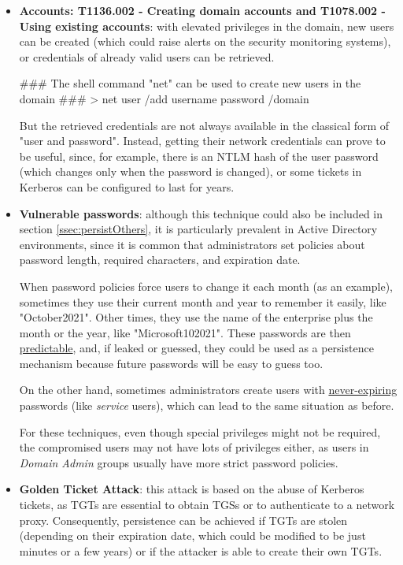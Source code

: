 \begin{itemize}
\item \textbf{Accounts: T1136.002 - Creating domain accounts and T1078.002 - Using existing accounts}: with elevated privileges in the domain, new users can be created (which could raise alerts on the security monitoring systems), or credentials of already valid users can be retrieved. 

\vspace{7pt}
\begin{spverbatim}
### The shell command "net" can be used to create new users in the domain ###
> net user /add username password /domain 
\end{spverbatim}
\vspace{7pt}

But the retrieved credentials are not always available in the classical form of "user and password". Instead, getting their network credentials can prove to be useful, since, for example, there is an NTLM hash of the user password (which changes only when the password is changed), or some tickets in Kerberos can be configured to last for years.

\item \textbf{Vulnerable passwords}: although this technique could also be included in section \ref{ssec:persistOthers}, it is particularly prevalent in Active Directory environments, since it is common that administrators set policies about password length, required characters, and expiration date. 

When password policies force users to change it each month (as an example), sometimes they use their current month and year to remember it easily, like "October2021". Other times, they use the name of the enterprise plus the month or the year, like "Microsoft102021". These passwords are then \underline{predictable}, and, if leaked or guessed, they could be used as a persistence mechanism because future passwords will be easy to guess too. 

On the other hand, sometimes administrators create users with \underline{never-expiring} passwords (like \textit{service} users), which can lead to the same situation as before. 

For these techniques, even though special privileges might not be required, the compromised users may not have lots of privileges either, as users in \textit{Domain Admin} groups usually have more strict password policies.

\item \textbf{Golden Ticket Attack}: this attack is based on the abuse of Kerberos tickets, as TGTs are essential to obtain TGSs or to authenticate to a network proxy. Consequently, persistence can be achieved if TGTs are stolen (depending on their expiration date, which could be modified to be just minutes or a few years) or if the attacker is able to create their own TGTs. 


\end{itemize}
